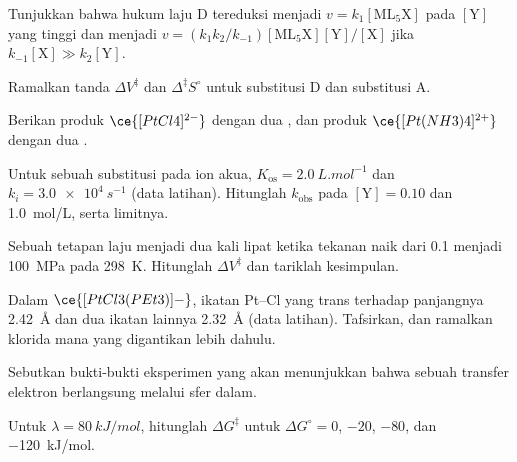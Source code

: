 \begin{exercise}[$\star$]\label{exo:b3:complex-mechanisms:2}
Tunjukkan bahwa hukum laju D tereduksi menjadi $v = k_1[\mathrm{ML_5X}]$ pada $[\mathrm Y]$ yang tinggi dan menjadi $v = (k_1k_2/k_{-1})
[\mathrm{ML_5X}][\mathrm Y]/[\mathrm X]$ jika $k_{-1}[\mathrm X] \gg k_2[\mathrm Y]$.
\end{exercise}

\begin{exercise}[$\star$]\label{exo:b3:complex-mechanisms:3}
Ramalkan tanda $\Delta V^{\ddagger}$ dan $\Delta^{\ddagger}S^\circ$ untuk substitusi D dan substitusi A.
\end{exercise}

\begin{exercise}[$\star$]\label{exo:b3:complex-mechanisms:4}
Berikan produk $\ce{[PtCl4]^{2-}}$ dengan dua , dan produk $\ce{[Pt(NH3)4]^{2+}}$ dengan dua .
\end{exercise}

\begin{exercise}[$\star\star$]\label{exo:b3:complex-mechanisms:5}
Untuk sebuah substitusi pada ion akua, $K_{\mathrm{os}} = \qty{2.0}{L.mol^{-1}}$ dan $k_i = \qty{3.0e4}{s^{-1}}$ (data
latihan). Hitunglah $k_{\mathrm{obs}}$ pada $[\mathrm Y] = 0.10$ dan \qty{1.0}{mol/L}, serta limitnya.
\end{exercise}

\begin{exercise}[$\star\star$]\label{exo:b3:complex-mechanisms:6}
Sebuah tetapan laju menjadi dua kali lipat ketika tekanan naik dari 0.1 menjadi \qty{100}{MPa} pada \qty{298}{K}.
Hitunglah $\Delta V^{\ddagger}$ dan tariklah kesimpulan.
\end{exercise}

\begin{exercise}[$\star\star$]\label{exo:b3:complex-mechanisms:7}
Dalam $\ce{[PtCl3(PEt3)]-}$, ikatan Pt--Cl yang trans terhadap  panjangnya \qty{2.42}{\angstrom} dan dua ikatan lainnya \qty{2.32}{\angstrom}
(data latihan). Tafsirkan, dan ramalkan klorida mana yang digantikan lebih dahulu.
\end{exercise}

\begin{exercise}[$\star\star$]\label{exo:b3:complex-mechanisms:8}
Sebutkan bukti-bukti eksperimen yang akan menunjukkan bahwa sebuah transfer elektron
berlangsung melalui sfer dalam.
\end{exercise}

\begin{exercise}[$\star\star$]\label{exo:b3:complex-mechanisms:9}
Untuk $\lambda = \qty{80}{kJ/mol}$, hitunglah $\Delta G^{\ddagger}$ untuk $\Delta G^\circ = 0$, $-20$, $-80$, dan \qty{-120}{kJ/mol}.
\end{exercise}

